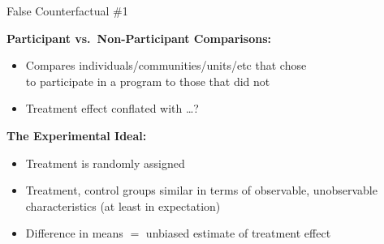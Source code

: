\documentclass[10pt,xcolor=table,ignorenonframetext,handout,aspectratio=169]{beamer}
\newlength{\wideitemsep}
\let\olditem\item
\renewcommand{\item}{\setlength{\itemsep}{\wideitemsep}\olditem}
\begin{document}

\begin{frame}{False Counterfactual \#1}

\medskip
\textbf{Participant vs.~Non-Participant Comparisons:}

\medskip
\begin{itemize}
	
	\item
	Compares individuals/communities/units/etc that chose \\
	to participate in a program to those that did not
	
	\item 
	Treatment effect conflated with \ldots ?
	
\end{itemize}

\pause
\medskip
\medskip
\textbf{The Experimental Ideal:}

\medskip
\begin{itemize}
	
	\item
	Treatment is randomly assigned
	
	\item
	Treatment, control groups similar in terms of observable, unobservable characteristics (at least in expectation)
	
	\item 
	Difference in means $=$ unbiased estimate of treatment effect
	
\end{itemize}

\end{frame}



\end{document}
